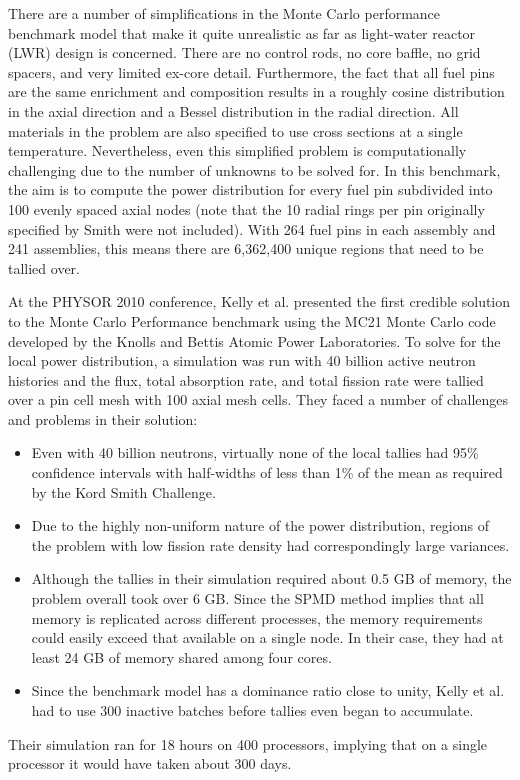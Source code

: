 There are a number of simplifications in the Monte Carlo performance benchmark
model that make it quite unrealistic as far as light-water reactor (LWR) design
is concerned. There are no control rods, no core baffle, no grid spacers, and
very limited ex-core detail. Furthermore, the fact that all fuel pins are the
same enrichment and composition results in a roughly cosine distribution in the
axial direction and a Bessel distribution in the radial direction. All materials
in the problem are also specified to use cross sections at a single
temperature. Nevertheless, even this simplified problem is computationally
challenging due to the number of unknowns to be solved for. In this benchmark,
the aim is to compute the power distribution for every fuel pin subdivided into
100 evenly spaced axial nodes (note that the 10 radial rings per pin originally
specified by Smith were not included). With 264 fuel pins in each assembly and
241 assemblies, this means there are 6,362,400 unique regions that need to be
tallied over.

At the PHYSOR 2010 conference, Kelly et al. presented the first credible
solution to the Monte Carlo Performance benchmark \cite{physor-kelly-2010} using
the MC21 Monte Carlo code \cite{mc-sutton-2007} developed by the Knolls and
Bettis Atomic Power Laboratories. To solve for the local power distribution, a
simulation was run with 40 billion active neutron histories and the flux, total
absorption rate, and total fission rate were tallied over a pin cell mesh with
100 axial mesh cells. They faced a number of challenges and problems in their
solution:
\begin{itemize}
\item Even with 40 billion neutrons, virtually none of the local tallies had
  95\% confidence intervals with half-widths of less than 1\% of the mean as
  required by the Kord Smith Challenge.
\item Due to the highly non-uniform nature of the power distribution, regions of
  the problem with low fission rate density had correspondingly large variances.
\item Although the tallies in their simulation required about 0.5 GB of memory,
  the problem overall took over 6 GB. Since the SPMD method implies that all
  memory is replicated across different processes, the memory requirements could
  easily exceed that available on a single node. In their case, they had at
  least 24 GB of memory shared among four cores.
\item Since the benchmark model has a dominance ratio close to unity, Kelly et
  al. had to use 300 inactive batches before tallies even began to accumulate.
\end{itemize}
Their simulation ran for 18 hours on 400 processors, implying that on a single
processor it would have taken about 300 days.

